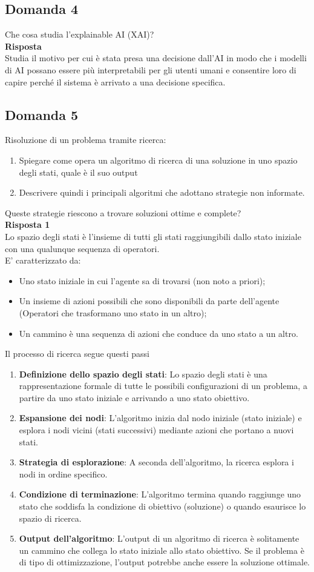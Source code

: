 \documentclass[../main.tex]{subfiles}
\begin{document}
	\subsection{Domanda 4}
	Che cosa studia l’explainable AI (XAI)?\\
	\textbf{Risposta}\\
	Studia il motivo per cui è stata presa una decisione dall’AI in modo che i modelli di AI possano essere più interpretabili per gli utenti umani e consentire loro di capire perché il sistema è arrivato a una decisione specifica.
	\subsection{Domanda 5}
	Risoluzione di un problema tramite ricerca:
	\begin{enumerate}
		\item Spiegare come opera un algoritmo di ricerca di una soluzione in uno spazio degli stati, quale è il suo output 
		\item Descrivere quindi i principali algoritmi che adottano strategie non informate. 
	\end{enumerate}
	Queste strategie riescono a trovare soluzioni ottime e complete?\\
	\textbf{Risposta 1}\\
	Lo spazio degli stati è l’insieme di tutti gli stati raggiungibili dallo stato iniziale con una qualunque sequenza di operatori.\\
	E’ caratterizzato da:
	\begin{itemize}
		\item Uno stato iniziale in cui l’agente sa di trovarsi (non noto a priori); 
		\item Un insieme di azioni possibili che sono disponibili da parte dell’agente (Operatori che trasformano uno stato in un altro);
		\item Un cammino è una sequenza di azioni che conduce da uno stato a un altro.
	\end{itemize}
	Il processo di ricerca segue questi passi
	\begin{enumerate}
		\item \textbf{Definizione dello spazio degli stati}: Lo spazio degli stati è una rappresentazione formale di tutte le possibili configurazioni di un problema, a partire da uno stato iniziale e arrivando a uno stato obiettivo.
		\item \textbf{Espansione dei nodi}: L'algoritmo inizia dal nodo iniziale (stato iniziale) e esplora i nodi vicini (stati successivi) mediante azioni che portano a nuovi stati.
		\item \textbf{Strategia di esplorazione}: A seconda dell'algoritmo, la ricerca esplora i nodi in ordine specifico.
		\item \textbf{Condizione di terminazione}: L'algoritmo termina quando raggiunge uno stato che soddisfa la condizione di obiettivo (soluzione) o quando esaurisce lo spazio di ricerca.
		\item \textbf{Output dell'algoritmo}: L'output di un algoritmo di ricerca è solitamente un cammino che collega lo stato iniziale allo stato obiettivo. Se il problema è di tipo di ottimizzazione, l'output potrebbe anche essere la soluzione ottimale.
	\end{enumerate}
\end{document}
